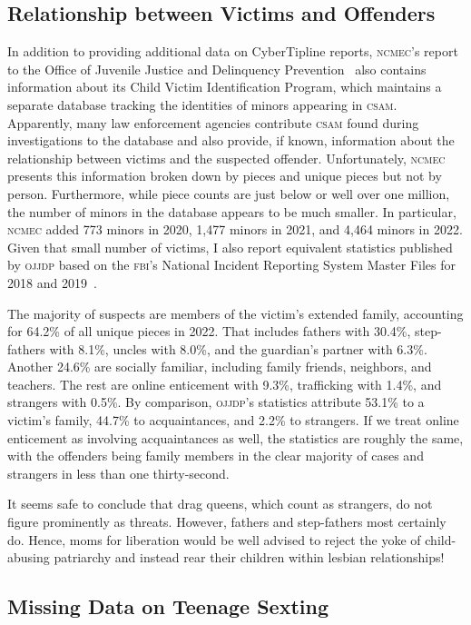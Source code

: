 \documentclass[nonacm,screen]{acmart}
\newcommand\V[1]{\textsc{\MakeLowercase{#1}}}
\begin{document}
\subsection{Relationship between Victims and Offenders}

In addition to providing additional data on CyberTipline reports, \V{NCMEC}'s
report to the Office of Juvenile Justice and Delinquency
Prevention~\cite{NCMEC2023} also contains information about its Child Victim
Identification Program, which maintains a separate database tracking the
identities of minors appearing in \V{CSAM}. Apparently, many law enforcement
agencies contribute \V{CSAM} found during investigations to the database and
also provide, if known, information about the relationship between victims and
the suspected offender. Unfortunately, \V{NCMEC} presents this information
broken down by pieces and unique pieces but not by person. Furthermore, while
piece counts are just below or well over one million, the number of minors in
the database appears to be much smaller. In particular, \V{NCMEC} added 773
minors in 2020, 1,477 minors in 2021, and 4,464 minors in 2022. Given that small
number of victims, I also report equivalent statistics published by \V{OJJDP}
based on the \V{FBI}'s National Incident Reporting System Master Files for 2018
and 2019~\cite{OJJDPStats2022}.

The majority of suspects are members of the victim's extended family, accounting
for 64.2\% of all unique pieces in 2022. That includes fathers with 30.4\%,
step-fathers with 8.1\%, uncles with 8.0\%, and the guardian's partner with
6.3\%. Another 24.6\% are socially familiar, including family friends,
neighbors, and teachers. The rest are online enticement with 9.3\%, trafficking
with 1.4\%, and strangers with 0.5\%. By comparison, \V{OJJDP}'s statistics
attribute 53.1\% to a victim's family, 44.7\% to acquaintances, and 2.2\% to
strangers. If we treat online enticement as involving acquaintances as well, the
statistics are roughly the same, with the offenders being family members in the
clear majority of cases and strangers in less than one thirty-second.

It seems safe to conclude that drag queens, which count as strangers, do not
figure prominently as threats. However, fathers and step-fathers most certainly
do. Hence, moms for liberation would be well advised to reject the yoke of
child-abusing patriarchy and instead rear their children within lesbian
relationships!


\subsection{Missing Data on Teenage Sexting}
\end{document}
